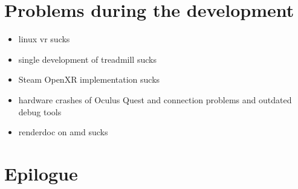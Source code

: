 \label{sec:problems}
\section{Problems during the development}
\begin{itemize}
    \item linux vr sucks
    \item single development of treadmill sucks
    \item Steam OpenXR implementation sucks
    \item hardware crashes of Oculus Quest and connection problems and outdated debug tools
    \item renderdoc on amd sucks
\end{itemize}
\section{Epilogue}